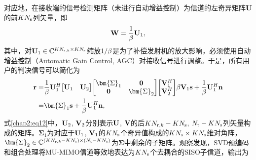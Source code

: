 对应地，在接收端的信号检测矩阵（未进行自动增益控制）为信道的左奇异矩阵${{\bf{U}}}$的前${K{N_{\rm{s}}}}$列矢量，即
\begin{equation}\label{chap2:eq11}
  {\bf{W}} = \frac{1}{\beta }{{\bf{U}}_1},
\end{equation}
其中，对${{{\bf{U}}_1} \in {\mathbb{C}^{K{N_{{\rm{r}},k}} \times K{N_{\rm{s}}}}}}$缩放${{1 \mathord{\left/
 {\vphantom {1 \beta }} \right. \kern-\nulldelimiterspace} \beta }}$是为了补偿发射机的放大影响，必须使用自动增益控制（Automatic Gain Control, AGC）对接收信号进行调整。于是，所有用户的判决信号可以简化为
\begin{align}\label{chap2:eq12}
\nonumber  {\bf{r}} = & {\frac{1}{\beta }}{{\bf{U}}_1^H}{\begin{bmatrix}
                                             {{{\bf{U}}_1}} & {{{\bf{U}}_2}}
                                                         \end{bmatrix}}
                                                        {\begin{bmatrix}
                                                            {{{\bm{\Sigma }}_1}} & {\bf{0}} \\
                                                            {\bf{0}} & {{{\bm{\Sigma }}_2}}
                                                         \end{bmatrix}}
                                                        {\begin{bmatrix}
                                                            {{\bf{V}}_1^H} \\
                                                            {{\bf{V}}_2^H}
                                                         \end{bmatrix}}
                                                         \beta {{\bf{V}}_1}{\bf{s}}+\frac{1}{\beta }{\bf{U}}_1^H{\bf{n}} \\
  = & {{\bm{\Sigma }}_1}{\bf{s}} + \frac{1}{\beta }{\bf{U}}_1^H{\bf{n}},
\end{align}
式\eqref{chap2:eq12}中，${{{\bf{U}}_2}}$, ${{{\bf{V}}_2}}$分别表示${{\bf{U}}}$, ${{\bf{V}}}$的后${{K{N_{{\rm{r}},k}} - K{N_{\rm{s}}}}}$, ${{{N_{\rm{t}}} - K{N_{\rm{s}}}}}$列矢量构成的矩阵。${{{\bm{\Sigma }}_1}}$为对应于${{{\bf{U}}_1}}$, ${{{\bf{V}}_1}}$的${K{N_{\rm{s}}}}$个奇异值构成的${{K{N_{\rm{s}}} \times K{N_{\rm{s}}}}}$维对角阵，${{{\bm{\Sigma }}_2} \in {\mathbb{C}^{\left( {K{N_{{\rm{r}},k}} - K{N_{\rm{s}}}} \right) \times \left( {{N_{\rm{t}}} - K{N_{\rm{s}}}} \right)}}}$为${{{\bm{\Sigma }}}}$中剩余的子矩阵。观察发现，SVD预编码和组合处理将MU-MIMO信道等效地表达为${K{N_{\rm{s}}}}$个去耦合的SISO子信道，输出为

